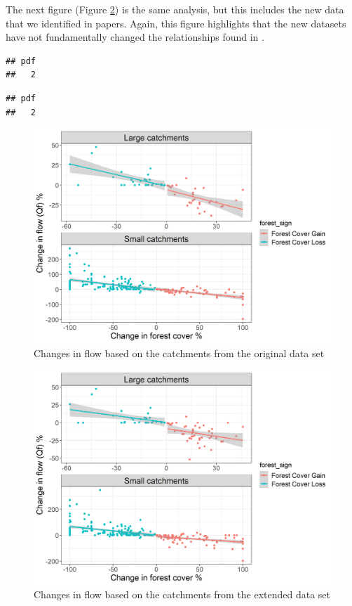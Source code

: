 \documentclass[]{elsarticle} %
\begin{document}
The next figure (Figure \ref{fig:Fig2Zhangnew}) is the same analysis, but this includes the new data that we identified in papers. Again, this figure highlights that the new datasets have not fundamentally changed the relationships found in \citet{zhang2017}.

\begin{verbatim}
## pdf 
##   2
\end{verbatim}

\begin{verbatim}
## pdf 
##   2
\end{verbatim}

\begin{figure}
\includegraphics[width=0.9\linewidth]{Fig2Zhang} \caption{Changes in flow based on the catchments from the original data set}\label{fig:Fig2Zhang}
\end{figure}

\begin{figure}
\includegraphics[width=0.9\linewidth]{Fig2Zhang_all} \caption{Changes in flow based on the catchments from the extended data set}\label{fig:Fig2Zhangnew}
\end{figure}
\end{document}
